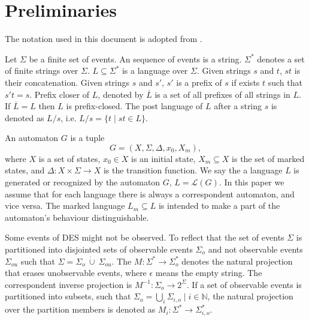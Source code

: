 \documentclass[a4paper, 10pt, conference]{ieeeconf} \IEEEoverridecommandlockouts
\begin{document}


\section{Preliminaries}
\label{sec:Preliminaries}
The notation used in this document is adopted from
\cite{cassandras_introduction_2010}.

Let $\Sigma$ be a finite set of events. An sequence of events is a string.
$\Sigma^*$ denotes a set of finite strings over $\Sigma$. $L\subseteq\Sigma^*$
is a language over $\Sigma$. Given strings $s$ and $t$, $st$ is their
concatenation. Given strings $s$ and $s'$, $s'$ is a prefix of $s$ if exists $t$
such that $s't = s$. Prefix closer of $L$, denoted by $\overline{L}$ is a set of
all prefixes of all strings in $L$.
If $\overline{L} = L$ then $L$ is prefix-closed. The post language of $L$ after
a string $s$ is denoted as $L/s$, i.e. $L/s = \{t\mid st \in L\}$.

An automaton $G$ is a tuple $$G=(X,\Sigma,\Delta,x_0, X_m),$$ where $X$ is a
set of states, $x_0 \in X$ is an initial state, $X_m \subseteq X$ is the set of
marked states, and $\Delta: X \times \Sigma \rightarrow X$ is the transition
function.
We say the a language $L$ is generated or recognized by the automaton $G$, $L =
\mathcal{L}(G)$. In this paper we assume that for each language there is always
a correspondent automaton, and vice versa. The marked language $L_m \subseteq
L$ is intended to make a part of the automaton's behaviour distinguishable.

Some events of DES might not be observed. To reflect that the set of events
$\Sigma$ is partitioned into disjointed sets of observable events $\Sigma_o$ and
not observable events $\Sigma_{ou}$ such that $\Sigma = \Sigma_o~\dot{\cup}~
\Sigma_{ou}$.
The $M: \Sigma^* \rightarrow \Sigma_o^*$ denotes the natural projection that
erases unobservable events, where $\epsilon$ means the empty string. The
correspondent inverse projection is $M^{-1}: \Sigma_o \rightarrow 2^\Sigma$. If
a set of observable events is partitioned into subsets, such that $\Sigma_o =
\bigcup_i \Sigma_{i,o} \mid i \in \mathbb{N}$, the natural projection over the
partition members is denoted as $M_i: \Sigma^* \rightarrow \Sigma_{i,o}^*$.
\end{document}

